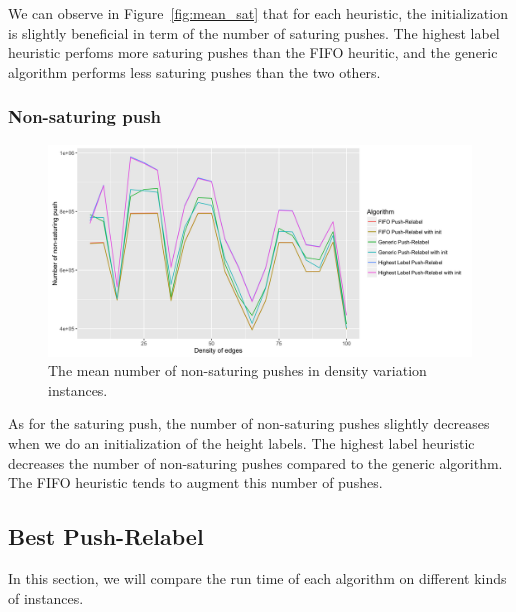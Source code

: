 We can observe in Figure~\ref{fig:mean_sat} that for each heuristic, the initialization is slightly beneficial in term of the number of saturing pushes. The highest label heuristic perfoms more saturing pushes than the FIFO heuritic, and the generic algorithm performs less saturing pushes than the two others.


\subsubsection{Non-saturing push}

\begin{figure}[H]
\begin{center}
\includegraphics[scale=0.125]{images/meannonsaturingpushes.png}
\caption{The mean number of non-saturing pushes in density variation instances.}
\label{fig:mean_non_sat}
\end{center}
\end{figure}

As for the saturing push, the number of non-saturing pushes slightly decreases when we do an initialization of the height labels. The highest label heuristic decreases the number of non-saturing pushes compared to the generic algorithm. The FIFO heuristic tends to augment this number of pushes.



\subsection{Best Push-Relabel}

In this section, we will compare the run time of each algorithm on different kinds of instances.


